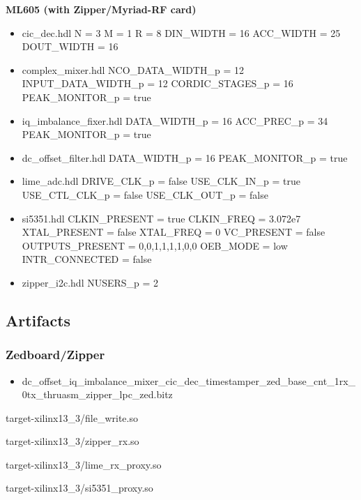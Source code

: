\begin{minipage}[t]{.5\textwidth}
	\textbf{ML605 (with Zipper/Myriad-RF card)}
	\begin{itemize}
		\item cic\_dec.hdl
			\subitem N = 3
			\subitem M = 1
			\subitem R = 8
			\subitem DIN\_WIDTH = 16
			\subitem ACC\_WIDTH = 25
			\subitem DOUT\_WIDTH = 16
		\item complex\_mixer.hdl
			\subitem NCO\_DATA\_WIDTH\_p = 12
			\subitem INPUT\_DATA\_WIDTH\_p = 12
			\subitem CORDIC\_STAGES\_p = 16
			\subitem PEAK\_MONITOR\_p = true
		\item iq\_imbalance\_fixer.hdl
			\subitem DATA\_WIDTH\_p = 16
			\subitem ACC\_PREC\_p = 34
			\subitem PEAK\_MONITOR\_p = true
		\item dc\_offset\_filter.hdl
			\subitem DATA\_WIDTH\_p = 16
			\subitem PEAK\_MONITOR\_p = true
		\item lime\_adc.hdl
			\subitem DRIVE\_CLK\_p = false
			\subitem USE\_CLK\_IN\_p = true
			\subitem USE\_CTL\_CLK\_p = false
			\subitem USE\_CLK\_OUT\_p = false
		\item si5351.hdl
			\subitem CLKIN\_PRESENT = true
			\subitem CLKIN\_FREQ = 3.072e7
			\subitem XTAL\_PRESENT = false
			\subitem XTAL\_FREQ = 0
			\subitem VC\_PRESENT = false
			\subitem OUTPUTS\_PRESENT = 0,0,1,1,1,1,0,0
			\subitem OEB\_MODE = low
			\subitem INTR\_CONNECTED = false
		\item zipper\_i2c.hdl
			\subitem NUSERS\_p = 2
	\end{itemize}
\end{minipage}\newpage




\subsection{Artifacts}
\subsubsection{Zedboard/Zipper}
	\begin{itemize}
	\item
dc\_offset\_iq\_imbalance\_mixer\_cic\_dec\_timestamper\_zed\_base\_cnt\_1rx\_0tx\_thruasm\_zipper\_lpc\_zed.bitz
	\end{itemize}
	\begin{itemize}
	\begin{minipage}[t]{.5\textwidth}
	\item target-xilinx13\_3/file\_write.so
	\item target-xilinx13\_3/zipper\_rx.so
	\end{minipage}
	\begin{minipage}[t]{.5\textwidth}
	\item target-xilinx13\_3/lime\_rx\_proxy.so
	\item target-xilinx13\_3/si5351\_proxy.so
	\end{minipage}
	\end{itemize}
